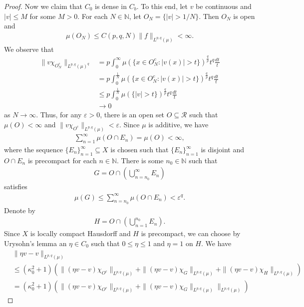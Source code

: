 \documentclass[10pt,reqno]{amsart}
\numberwithin{equation}{section}
\begin{document}
\begin{proof}
Now we claim that $C_{0}$ is dense in $C_{b}$. To this end, let $v$ be continuous and $|v|\leq M$ for some $M>0$. For each $N\in\mathbb{N}$, let $O_{N}=\{|v|>1/N\}$. Then $O_{N}$ is open and 
\begin{align*}
\mu(O_{N})\leq C(p,q,N)\|f\|_{L^{p,q}(\mu)}<\infty.
\end{align*}
We observe that
\begin{align*}
\|v\chi_{O_{N}^{c}}\|_{L^{p,q}(\mu)^{q}}&=p\int_{0}^{\infty}\mu(\{x\in O_{N}^{c}:|v(x)|>t\})^{\frac{q}{p}}t^{q}\frac{dt}{t}\\
&=p\int_{0}^{\frac{1}{N}}\mu(\{x\in O_{N}^{c}:|v(x)|>t\})^{\frac{q}{p}}t^{q}\frac{dt}{t}\\
&\leq p\int_{0}^{\frac{1}{N}}\mu(\{|v|>t\})^{\frac{q}{p}}t^{q}\frac{dt}{t}\\
&\rightarrow 0
\end{align*}
as $N\rightarrow\infty$. Thus, for any $\varepsilon>0$, there is an open set $O\subseteq\mathcal{R}$ such that $\mu(O)<\infty$ and $\|v\chi_{O^{c}}\|_{L^{p,q}(\mu)}<\varepsilon$. Since $\mu$ is additive, we have 
\begin{align*}
\sum_{n=1}^{\infty}\mu(O\cap E_{n})=\mu(O)<\infty,
\end{align*}
where the sequence $\{E_{n}\}_{n=1}^{\infty}\subseteq X$ is chosen such that $\{E_{n}\}_{n=1}^{\infty}$ is disjoint and $O\cap E_{n}$ is precompact for each $n\in\mathbb{N}$. There is some $n_{0}\in\mathbb{N}$ such that
\begin{align*}
G=O\cap\left(\bigcup_{n=n_{0}}^{\infty}E_{n}\right)
\end{align*}
satisfies
\begin{align*}
\mu(G)\leq\sum_{n=n_{0}}^{\infty}\mu(O\cap E_{n})<\varepsilon^{q}.
\end{align*}
Denote by 
\begin{align*}
H=O\cap\left(\bigcup_{n=1}^{n_{0}}E_{n}\right).
\end{align*}
Since $X$ is locally compact Hausdorff and $H$ is precompact, we can choose by Urysohn's lemma an $\eta\in C_{0}$ such that $0\leq\eta\leq 1$ and $\eta=1$ on $H$. We have
\begin{align*}
&\|\eta v-v\|_{L^{p,q}(\mu)}\\
&\leq(\kappa_{0}^{2}+1)(\|(\eta v-v)\chi_{O^{c}}\|_{L^{p,q}(\mu)}+\|(\eta v-v)\chi_{G}\|_{L^{p,q}(\mu)}+\|(\eta v-v)\chi_{H}\|_{L^{p,q}(\mu)})\\
&=(\kappa_{0}^{2}+1)(\|(\eta v-v)\chi_{O^{c}}\|_{L^{p,q}(\mu)}+\|(\eta v-v)\chi_{G}\|_{L^{p,q}(\mu)}\|_{L^{p,q}(\mu)})

\end{align*}
\end{proof}
\end{document}
